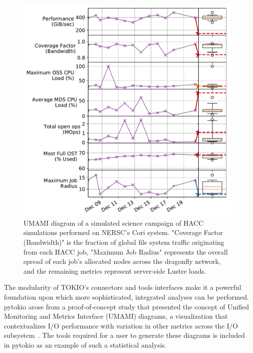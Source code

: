 \begin{figure}[t]
    \centering
    \includegraphics[width=1.0\columnwidth]{umami}
    \vspace{-.3in}
    \caption{UMAMI diagram of a simulated science campaign of HACC~\cite{Habib2012} simulations performed on NERSC's Cori system.  
    "Coverage Factor (Bandwidth)" is the fraction of global file system traffic originating from each HACC job, "Maximum Job Radius" represents the overall spread of each job's allocated nodes across the dragonfly network, and the remaining metrics represent server-side Lustre loads.}
    \label{fig:umami}
    \vspace{-.2in}
\end{figure}

The modularity of TOKIO's connectors and tools interfaces make it a powerful foundation upon which more sophisticated, integrated analyses can be performed.
pytokio arose from a proof-of-concept study that presented the concept of Unified Monitoring and Metrics Interface (UMAMI) diagrams, a visualization that contextualizes I/O performance with variation in other metrics across the I/O subsystem~\cite{Lockwood2017}.
The tools required for a user to generate these diagrams is included in pytokio as an example of such a statistical analysis.

